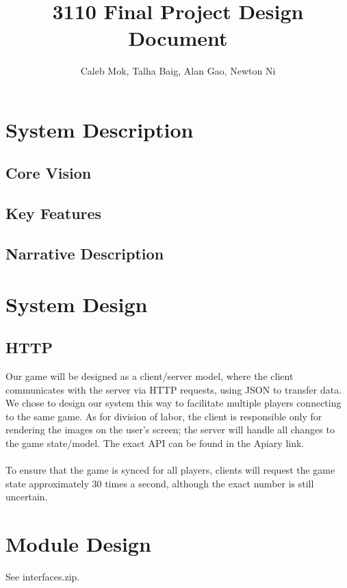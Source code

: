 \documentclass{article}
\author{Caleb Mok, Talha Baig, Alan Gao, Newton Ni}
\title{3110 Final Project Design Document}
\begin{document}
\maketitle

    \section{System Description}

        \subsection{Core Vision}

        \subsection{Key Features}

        \subsection{Narrative Description}

    \section{System Design}
	
        \subsection{HTTP}
       	Our game will be designed as a client/server model, where the client communicates with the server via HTTP requests, using JSON to transfer data. We chose to design our system this way to facilitate multiple players connecting to the same game. As for division of labor, the client is responsible only for rendering the images on the user's screen; the server will handle all changes to the game state/model. The exact API can be found in the Apiary link.\\
	\\
	To ensure that the game is synced for all players, clients will request the game state approximately 30 times a second, although the exact number is still uncertain. 

    \section{Module Design}

        See interfaces.zip.
\end{document}
